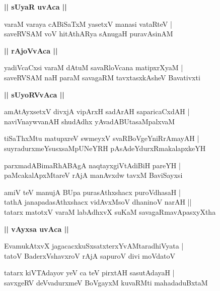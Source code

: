 \documentclass[twoside,12pt,openright]{book}
\newcounter{shloka}[chapter]
\def\uvaca#1{\centerline{{\large\textbf{#1}}}}
\begin{document}
\uvaca{|| sUyaR uvAca ||}

\begin{shloka}%
varaM varaya cABiSaTxM yasetxV manasi vataRteV |\\
saveRVSAM voV hitAthARya sAnugaH puravAsinAM 
\end{shloka}

\uvaca{|| rAjoVvAca ||}

\begin{shloka}%
yadiVcaCxsi varaM dAtuM savaRloVcana matipxrXyaM |\\
saveRVSAM naH paraM savagaRM tavxtasxkAsheV Bavativxti 
\end{shloka}

\uvaca{|| sUyoRVvAca ||}

\begin{shloka}%
amAtAyxsetxV divxjA vipArxH sadArAH saparicaCxdAH |\\
naviVnaywvanAH shudAdhx yAvadABUtasaMpalxvaM
\end{shloka}

\begin{shloka}%
tiSaThxMtu matupxreV swmeyxV svaRBoVgeYniRrAmayAH |\\
suyradurxmeYsusxsaMpUNeYRH pAsAdeYdurxRmakalapxkeYH
\end{shloka}

\begin{shloka}%
parxmadABimaRhABAgA naqtayxgiVtAdiBiH pareYH |\\
paMcakalApxMtareV rAjA manAvxdw tavxM BaviSayxsi
\end{shloka}

\begin{shloka}%
amiV teV manujA BUpa purasAthxshacx puroVdhasaH |\\
tathA janapadasAthxshacx vidAvxMsoV dhaninoV narAH ||\\
tatarx matotxV varaM labAdhxvX suKaM savagaRmavApasxyXtha 
\end{shloka}

\uvaca{|| vAyxsa uvAca ||}

\begin{shloka}%
EvamukAtxvX jagacacxkuSxsatxterxYvAMtaradhiVyata |\\
tatoV BaderxVshavxroV rAjA sapuroV divi moVdatoV 
\end{shloka}

\begin{shloka}%
tatarx kiVTAdayov yeV ca teV pirxtAH sasutAdayaH |\\
savxgeRV deVvadurxmeV BoVgayxM kuvaRMti mahadaduBxtaM 
\end{shloka}
\end{document}
